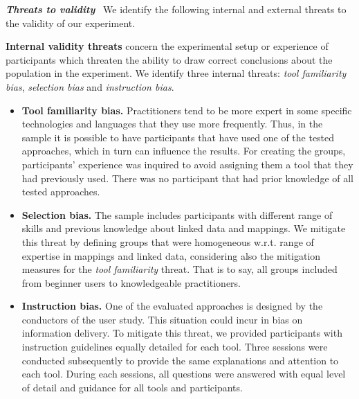 \noindent\textit{\textbf{Threats to validity}}~\parencite{creswell2017research} We identify the following internal and external threats to the validity of our experiment.

\textbf{Internal validity threats} concern the experimental setup or experience of participants which threaten the ability to draw correct conclusions about the population in the experiment. We identify three internal threats: \textit{tool familiarity bias}, \textit{selection bias} and \textit{instruction bias}.
\begin{itemize}
    \item \textbf{Tool familiarity bias.} Practitioners tend to be more expert in some specific technologies and languages that they use more frequently. Thus, in the sample it is possible to have participants that have used one of the tested approaches, which in turn can influence the results. For creating the groups, participants' experience was inquired to avoid assigning them a tool that they had previously used. There was no participant that had prior knowledge of all tested approaches.
    \item \textbf{Selection bias.} The sample includes participants with different range of skills and previous knowledge about linked data and mappings. We mitigate this threat by defining groups that were  homogeneous w.r.t. range of expertise in mappings and linked data, considering also the mitigation measures for the \textit{tool familiarity} threat. That is to say, all groups included from beginner users to knowledgeable practitioners. 
    \item \textbf{Instruction bias.} One of the evaluated approaches is designed by the conductors of the user study. This situation could incur in bias on information delivery. To mitigate this threat, we provided participants with instruction guidelines equally detailed for each tool. Three sessions were conducted subsequently to provide the same explanations and attention to each tool. During each sessions, all questions were answered with equal level of detail and guidance for all tools and participants.
\end{itemize}

